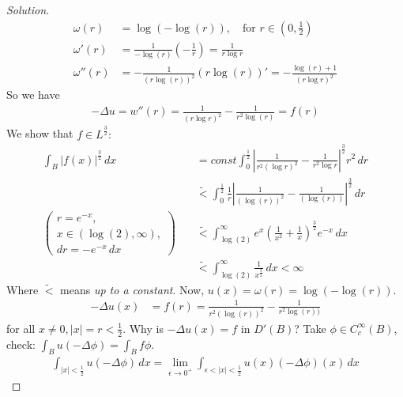\documentclass{report}
\theoremstyle{tommy}
\begin{document}
  \begin{proof}[Solution]
    \begin{align*}
      \omega(r) &= \log(-\log(r)), \quad \text{for } r \in \left(0, \frac{1}{2}\right) \\
      \omega'(r) &= \frac{1}{- \log(r)} \left(- \frac{1}{r}\right) = \frac{1}{r \log{r}} \\
      \omega''(r) &= - \frac{1}{(r \log(r))^2}(r \log(r))' = - \frac{\log(r)+1}{(r \log r)^2}
    \end{align*}
    So we have 
    \begin{align*}
      - \Delta u = w''(r) = \frac{1}{(r \log r)^2} - \frac{1}{r^2 \log(r)} = f(r)
    \end{align*}
    We show that \(f \in L^{\frac{3}{2}}: \) 
    \begin{align*}
      \int_B |f(x)|^{\frac{3}{2}} \, dx 
      &= const \int_0^{\frac{1}{2}} \left| \frac{1}{r^2 (\log r)^2} - \frac{1}{r^2 \log{r}} \right|^{\frac{3}{2}} r^2 \, dr \\
      &\tilde < \int_0^{\frac{1}{2}} \frac{1}{r} \left| \frac{1}{(\log(r))^2} - \frac{1}{(\log(r))} \right|^{\frac{3}{2}} \, dr \\
      \left(\begin{aligned}
        r = e^{-x}, \\
        x \in (\log(2), \infty), \\
        dr = -e^{-x} \, dx
      \end{aligned}\right) \quad &\tilde < \int_{\log(2)}^\infty e^x \left(\frac{1}{x^2} + \frac{1}{x}\right)^{\frac{3}{2}} e^{-x} \, dx \\
      &\tilde < \int_{\log(2)}^\infty \frac{1}{x^{\frac{3}{2}}} \, dx < \infty
    \end{align*}
    Where \(\tilde <\) means \emph{up to a constant}. Now, \(u(x) = \omega(r) = \log(-\log(r))\). 
    \begin{align*}
      - \Delta u(x) &= f(r) = \frac{1}{r^2(\log(r))^2} - \frac{1}{r^2\log(r))}
    \end{align*}
    for all \(x \ne 0, |x| = r < \frac{1}{2}\). Why is \(- \Delta u(x) = f\) in \(D'(B)\)? Take \(\phi \in C_c^\infty(B)\), check: \(\int_B u(-\Delta \phi) = \int_B f \phi\). 
    \begin{align*}
      \int_{|x| < \frac{1}{2}} u (- \Delta \phi) \, dx = \lim_{\epsilon \to 0^+} \int_{\epsilon < |x| < \frac{1}{2}} u(x) (- \Delta \phi)(x) \, dx

\end{align*}
\end{proof}
\end{document}
